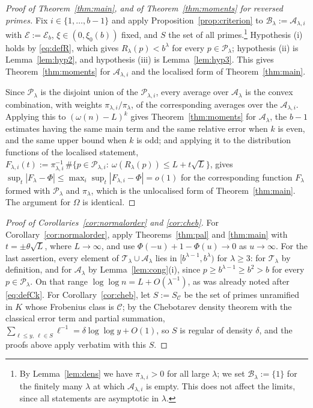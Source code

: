 \documentclass[11pt,a4paper]{article}
\theoremstyle{plain}
\theoremstyle{definition}
\numberwithin{equation}{section}
\begin{document}
\begin{proof}[Proof of Theorem~\ref{thm:main}, and of Theorem~\ref{thm:moments} for reversed primes]
Fix $i\in\{1,\dots,b-1\}$ and apply Proposition~\ref{prop:criterion} to
$\mathcal B_\lambda:=\mathcal A_{\lambda,i}$ with $\mathcal E:=\mathcal E_b$, $\xi\in(0,\xi_0(b))$
fixed, and $S$ the set of all primes.\footnote{By Lemma~\ref{lem:dens} we have $\pi_{\lambda,i}>0$ for
all large $\lambda$; we set $\mathcal B_\lambda:=\{1\}$ for the finitely many $\lambda$ at which
$\mathcal A_{\lambda,i}$ is empty. This does not affect the limits, since all statements are asymptotic
in $\lambda$.} Hypothesis (i) holds by
\eqref{eq:defR}, which gives $R_\lambda(p)<b^{\lambda}$ for every $p\in\mathcal P_\lambda$; hypothesis
(ii) is Lemma~\ref{lem:hyp2}, and hypothesis (iii) is
Lemma~\ref{lem:hyp3}. This gives Theorem~\ref{thm:moments} for $\mathcal A_{\lambda,i}$ and the localised
form of Theorem~\ref{thm:main}.

Since $\mathcal P_\lambda$ is the disjoint union of the $\mathcal P_{\lambda,i}$, every average over
$\mathcal A_\lambda$ is the convex combination, with weights $\pi_{\lambda,i}/\pi_\lambda$, of the
corresponding averages over the $\mathcal A_{\lambda,i}$. Applying this to $(\omega(n)-L)^{k}$ gives
Theorem~\ref{thm:moments} for $\mathcal A_\lambda$, the $b-1$ estimates having the same main term and the
same relative error when $k$ is even, and the same upper bound when $k$ is odd; and applying it to the
distribution functions of the localised statement,
$F_{\lambda,i}(t):=\pi_{\lambda,i}^{-1}\,\#\bigl\{p\in\mathcal P_{\lambda,i}:\ \omega(R_\lambda(p))\le
L+t\sqrt L\bigr\}$,
gives $\sup_t|F_\lambda-\Phi|\le\max_i\sup_t|F_{\lambda,i}-\Phi|=o(1)$ for the corresponding function
$F_\lambda$ formed with $\mathcal P_\lambda$ and $\pi_\lambda$, which is the unlocalised form of
Theorem~\ref{thm:main}. The argument for $\Omega$ is identical.
\end{proof}

\begin{proof}[Proof of Corollaries~\ref{cor:normalorder} and \ref{cor:cheb}]
For Corollary~\ref{cor:normalorder}, apply Theorems~\ref{thm:pal} and \ref{thm:main} with
$t=\pm\theta\sqrt L$, where $L\to\infty$, and use $\Phi(-u)+1-\Phi(u)\to0$ as $u\to\infty$. For the
last assertion, every element of $\mathcal T_\lambda\cup\mathcal A_\lambda$ lies in
$[b^{\lambda-1},b^{\lambda})$ for $\lambda\ge3$: for $\mathcal T_\lambda$ by definition, and for
$\mathcal A_\lambda$ by Lemma~\ref{lem:cong}(i), since $p\ge b^{\lambda-1}\ge b^{2}>b$ for every
$p\in\mathcal P_\lambda$. On that range $\log\log n=L+O(\lambda^{-1})$, as was already noted after
\eqref{eq:defCk}. For
Corollary~\ref{cor:cheb}, let $S:=S_{\mathcal C}$ be the set of primes unramified in $K$ whose Frobenius
class is $\mathcal C$; by the Chebotarev density theorem with the classical
error term \cite[Thm.~1.3]{LO} and partial summation,
$\sum_{\ell\le y,\ \ell\in S}\ell^{-1}=\delta\log\log y+O(1)$, so $S$ is regular of density $\delta$, and
the proofs above apply verbatim with this $S$.
\end{proof}
\end{document}
